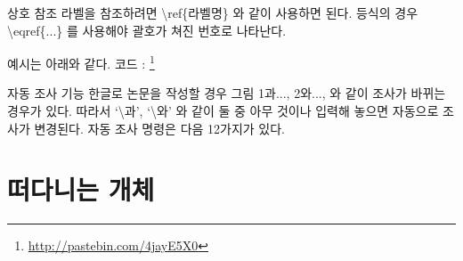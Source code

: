 \documentclass[12pt]{beamer}
\begin{document}
\begin{frame}{상호 참조}
	라벨을 참조하려면 \textbackslash ref\{라벨명\} 와 같이 사용하면 된다.
	등식의 경우 \textbackslash eqref\{...\} 를 사용해야 괄호가 쳐진 번호로 나타난다.
	
	예시는 아래와 같다. 코드 : \footnote{\url{http://pastebin.com/4jayE5X0}}
	\begin{figure}
		\centering
	\end{figure}
\end{frame}
\begin{frame}{자동 조사 기능}
	한글로 논문을 작성할 경우 그림 1과..., 2와..., 와 같이 조사가 바뀌는 경우가 있다. 따라서 `\textbackslash 과', `\textbackslash 와' 와 같이 둘 중 아무 것이나 입력해 놓으면 자동으로 조사가 변경된다. 자동 조사 명령은 다음 12가지가 있다.
	\begin{center}
	\end{center}
\end{frame}

\section{떠다니는 개체}
\end{document}

